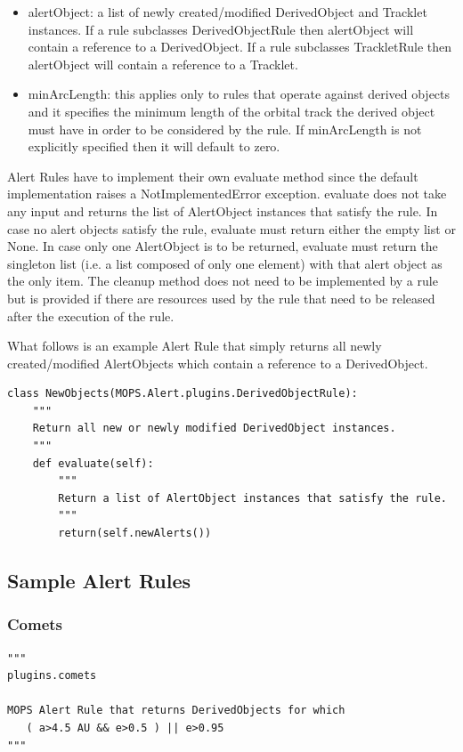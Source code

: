 \documentclass[panstarrs]{panstarrs}
\begin{document}
\begin{appendices}
\begin{itemize}
\item alertObject: a list of newly created/modified DerivedObject and Tracklet instances. If a rule subclasses DerivedObjectRule then alertObject will contain a reference to a DerivedObject. If a rule subclasses TrackletRule then alertObject will contain a reference to a Tracklet. 

\item minArcLength: this applies only to rules that operate against derived objects and it specifies the minimum length of the orbital track the derived object must have in order to be considered by the rule. If minArcLength is not explicitly specified then it will default to zero. 
\end{itemize}

Alert Rules have to implement their own evaluate method since the default implementation raises a NotImplementedError exception. evaluate does not take any input and returns the list of AlertObject instances that satisfy the rule. In case no alert objects satisfy the rule, evaluate must return either the empty list or None. In case only one AlertObject is to be returned, evaluate must return the singleton list (i.e. a list composed of only one element) with that alert object as the only item. The cleanup method does not need to be implemented by a rule but is provided if there are resources used by the rule that need to be released after the execution of the rule.

What follows is an example Alert Rule that simply returns all newly created/modified AlertObjects which contain a reference to a DerivedObject.
\begin{verbatim}
class NewObjects(MOPS.Alert.plugins.DerivedObjectRule):
    """
    Return all new or newly modified DerivedObject instances.
    """
    def evaluate(self):
        """
        Return a list of AlertObject instances that satisfy the rule.
        """
        return(self.newAlerts())
\end{verbatim}

\subsection{Sample Alert Rules}
\subsubsection{Comets}
\begin{verbatim}
"""
plugins.comets

MOPS Alert Rule that returns DerivedObjects for which
   ( a>4.5 AU && e>0.5 ) || e>0.95
"""


\end{verbatim}
\end{appendices}
\end{document}
